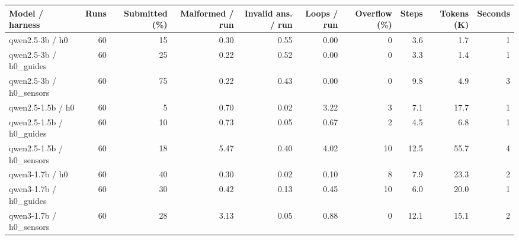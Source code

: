 {\small
\begin{adjustbox}{max width=\linewidth}
\begin{tabular}{lrrrrrrrrr}
\toprule
Model / harness & Runs & Submitted (\%) & Malformed / run & Invalid ans. / run & Loops / run & Overflow (\%) & Steps & Tokens (K) & Seconds \\
\midrule
qwen2.5-3b / h0 & 60 & 15 & 0.30 & 0.55 & 0.00 & 0 & 3.6 & 1.7 & 1 \\
qwen2.5-3b / h0\_guides & 60 & 25 & 0.22 & 0.52 & 0.00 & 0 & 3.3 & 1.4 & 1 \\
qwen2.5-3b / h0\_sensors & 60 & 75 & 0.22 & 0.43 & 0.00 & 0 & 9.8 & 4.9 & 3 \\
qwen2.5-1.5b / h0 & 60 & 5 & 0.70 & 0.02 & 3.22 & 3 & 7.1 & 17.7 & 1 \\
qwen2.5-1.5b / h0\_guides & 60 & 10 & 0.73 & 0.05 & 0.67 & 2 & 4.5 & 6.8 & 1 \\
qwen2.5-1.5b / h0\_sensors & 60 & 18 & 5.47 & 0.40 & 4.02 & 10 & 12.5 & 55.7 & 4 \\
qwen3-1.7b / h0 & 60 & 40 & 0.30 & 0.02 & 0.10 & 8 & 7.9 & 23.3 & 2 \\
qwen3-1.7b / h0\_guides & 60 & 30 & 0.42 & 0.13 & 0.45 & 10 & 6.0 & 20.0 & 1 \\
qwen3-1.7b / h0\_sensors & 60 & 28 & 3.13 & 0.05 & 0.88 & 0 & 12.1 & 15.1 & 2 \\
\bottomrule
\end{tabular}
\end{adjustbox}
}
